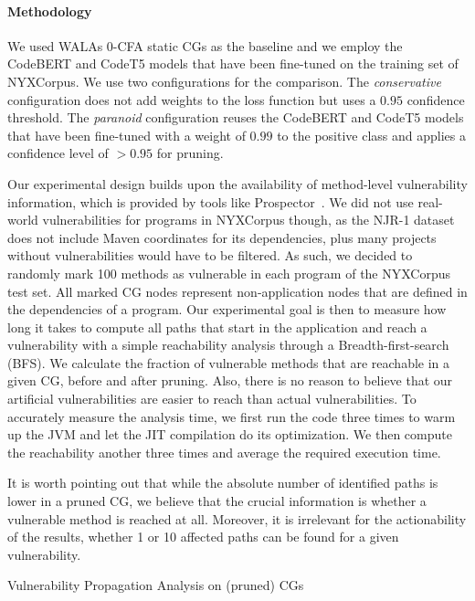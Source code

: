 \paragraph{Methodology} 
We used WALAs 0-CFA static CGs as the baseline and we employ the CodeBERT and CodeT5 models that have been fine-tuned on the training set of NYXCorpus.
We use two configurations for the comparison.
The \emph{conservative} configuration does not add weights to the loss function but uses a $0.95$ confidence threshold.
The \emph{paranoid} configuration reuses the CodeBERT and CodeT5 models that have been fine-tuned with a weight of $0.99$ to the positive class and applies a confidence level of $>0.95$ for pruning.

Our experimental design builds upon the availability of method-level vulnerability information, which is provided by tools like Prospector~\cite{ponta2019msr}.
We did not use real-world vulnerabilities for programs in NYXCorpus though, as the NJR-1 dataset does not include Maven coordinates for its dependencies, plus many projects without vulnerabilities would have to be filtered.
As such, we decided to randomly mark 100 methods as vulnerable in each program of the NYXCorpus test set.
All marked CG nodes represent non-application nodes that are defined in the dependencies of a program.
Our experimental goal is then to measure how long it takes to compute all paths that start in the application and reach a vulnerability with a simple reachability analysis through a Breadth-first-search (BFS).
We calculate the fraction of vulnerable methods that are reachable in a given CG, before and after pruning.
Also, there is no reason to believe that our artificial vulnerabilities are easier to reach than actual vulnerabilities.
To accurately measure the analysis time, we first run the code three times to warm up the JVM and let the JIT compilation do its optimization.
We then compute the reachability another three times and average the required execution time.

It is worth pointing out that while the absolute number of identified paths is lower in a pruned CG, we believe that the crucial information is whether a vulnerable method is reached at all.
Moreover, it is irrelevant for the actionability of the results, whether 1 or 10 affected paths can be found for a given vulnerability.

\begin{table}
\centering
\caption{Vulnerability Propagation Analysis on (pruned) CGs}
\label{ch1:tab:vuln-analysis-results}

\end{table}

